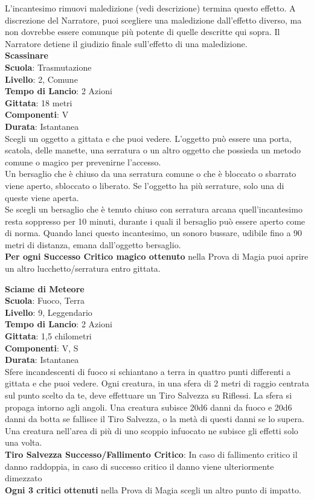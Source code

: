 \begin{multicols}{2}
L'incantesimo rimuovi maledizione (vedi descrizione) termina questo effetto. A discrezione del Narratore, puoi scegliere una maledizione dall'effetto diverso, ma non dovrebbe essere comunque più potente di quelle descritte qui sopra. Il Narratore detiene il giudizio finale sull'effetto di una maledizione.\\


\medskip\textbf{Scassinare}\\
\textbf{Scuola}: Trasmutazione\\
\textbf{Livello}: 2, Comune\\
\textbf{Tempo di Lancio}: 2 Azioni\\
\textbf{Gittata}: 18 metri\\
\textbf{Componenti}: V\\
\textbf{Durata}: Istantanea\\
Scegli un oggetto a gittata e che puoi vedere. L'oggetto può essere una porta, scatola, delle manette, una serratura o un altro oggetto che possieda un metodo comune o magico per prevenirne l'accesso.\\
Un bersaglio che è chiuso da una serratura comune o che è bloccato o sbarrato viene aperto, sbloccato o liberato. Se l'oggetto ha più serrature, solo una di queste viene aperta.\\
Se scegli un bersaglio che è tenuto chiuso con serratura arcana quell'incantesimo resta soppresso per 10 minuti, durante i quali il bersaglio può essere aperto come di norma. Quando lanci questo incantesimo, un sonoro bussare, udibile fino a 90 metri di distanza, emana dall'oggetto bersaglio.\\
\textbf{Per ogni Successo Critico magico ottenuto} nella Prova di Magia puoi aprire un altro lucchetto/serratura entro gittata.

\medskip\textbf{Sciame di Meteore}\hypertarget{sciamedimeteore}{}\\
\textbf{Scuola}: Fuoco, Terra\\
\textbf{Livello}: 9, Leggendario\\
\textbf{Tempo di Lancio}: 2 Azioni\\
\textbf{Gittata}: 1,5 chilometri\\
\textbf{Componenti}: V, S\\
\textbf{Durata}: Istantanea\\
Sfere incandescenti di fuoco si schiantano a terra in quattro punti differenti a gittata e che puoi vedere. Ogni creatura, in una sfera di 2 metri di raggio centrata sul punto scelto da te, deve effettuare un Tiro Salvezza su Riflessi. La sfera si propaga intorno agli angoli. Una creatura subisce 20d6 danni da fuoco e 20d6 danni da botta se fallisce il Tiro Salvezza, o la metà di
questi danni se lo supera. Una creatura nell'area di più di uno scoppio infuocato ne subisce gli effetti solo una volta.\\
\textbf{Tiro Salvezza Successo/Fallimento Critico}: In caso di fallimento critico il danno raddoppia, in caso di successo critico il danno viene ulteriormente dimezzato\\
\textbf{Ogni 3 critici ottenuti} nella Prova di Magia scegli un altro punto di impatto.


\end{multicols}
